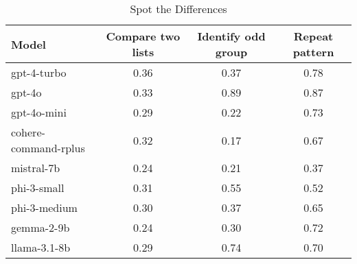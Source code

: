 
\begin{table*}[h]
    \centering
\begin{tabular}{l|ccc}
\toprule
Model & Compare two lists & Identify odd group & Repeat pattern \\
\midrule
gpt-4-turbo & 0.36 & 0.37 & 0.78 \\
gpt-4o & 0.33 & 0.89 & 0.87 \\
gpt-4o-mini & 0.29 & 0.22 & 0.73 \\
cohere-command-rplus & 0.32 & 0.17 & 0.67 \\
mistral-7b & 0.24 & 0.21 & 0.37 \\
phi-3-small & 0.31 & 0.55 & 0.52 \\
phi-3-medium & 0.30 & 0.37 & 0.65 \\
gemma-2-9b & 0.24 & 0.30 & 0.72 \\
llama-3.1-8b & 0.29 & 0.74 & 0.70 \\
\bottomrule
\end{tabular}
\caption{Spot the Differences}
\label{tab:differences}
\end{table*}